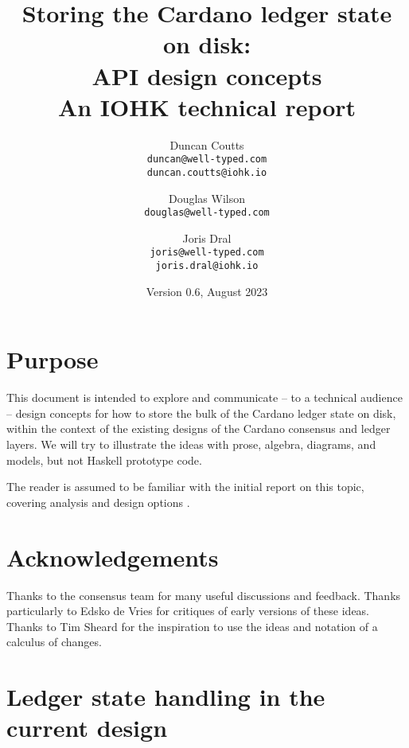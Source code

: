 \documentclass[11pt,a4paper]{article}
\begin{document}
\title{Storing the Cardano ledger state on disk: \\
       API design concepts \\
       {\large \sc An IOHK technical report}
  }
\date{Version 0.6, August 2023}
\author{Duncan Coutts      \\ {\small \texttt{duncan@well-typed.com}} \\
                              {\small \texttt{duncan.coutts@iohk.io}} \\
   \and Douglas Wilson     \\ {\small \texttt{douglas@well-typed.com}} \\
   \and Joris Dral         \\ {\small \texttt{joris@well-typed.com}} \\
                              {\small \texttt{joris.dral@iohk.io}} \\
   }

\maketitle

\section{Purpose}

This document is intended to explore and communicate -- to a technical audience
-- design concepts for how to store the bulk of the Cardano ledger state on
disk, within the context of the existing designs of the Cardano consensus and
ledger layers. We will try to illustrate the ideas with prose, algebra,
diagrams, and models, but not Haskell prototype code.

The reader is assumed to be familiar with the initial report on this topic,
covering analysis and design options \citep{utxo-db}.

\section{Acknowledgements}

Thanks to the consensus team for many useful discussions and feedback. Thanks
particularly to Edsko de Vries for critiques of early versions of these ideas.
Thanks to Tim Sheard for the inspiration to use the ideas and notation of a
calculus of changes.

\tableofcontents

\section{Ledger state handling in the current design}
\label{ledger-state-handling-in-the-current-design}
\end{document}
